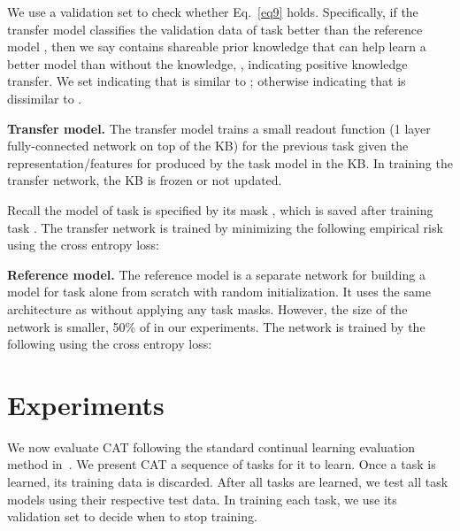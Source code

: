 \documentclass{article}
\begin{document}
We use a validation set to check whether Eq.~\ref{eq9} holds. Specifically, if the transfer model  classifies the validation data of task  better than the reference model , then we say  contains shareable prior knowledge that can help  learn a better model than without the knowledge, , indicating positive knowledge transfer. We set  indicating that  is similar to ; otherwise  indicating that  is dissimilar to .

\textbf{Transfer model.} The transfer model  trains a small readout function (1 layer fully-connected network on top of the KB) for the previous task  given the representation/features for  produced by the task  model in the KB. In training the transfer network, the KB is frozen or not updated. 

Recall the model of task  is specified by its mask , which is saved after training task . The transfer network is trained by minimizing the following empirical risk using the cross entropy loss:

\textbf{Reference model.} The reference model  is a separate network for building a model for task  alone from scratch with random initialization. It uses the same architecture as  without applying any task masks. However, the size of the network is smaller, 50\% of  in our experiments. The network is trained by the following using the cross entropy loss:




\section{Experiments}
\label{sec:experiments}

We now evaluate CAT following the standard continual learning evaluation method in~\citep{DBLP:journals/corr/abs-1909-08383}.
We present CAT a sequence of tasks for it to learn. Once a task is learned, its training data is discarded. After all tasks are learned, we test all task models using their respective test data. In training each task, we use its validation set to decide when to stop training.  
\end{document}
